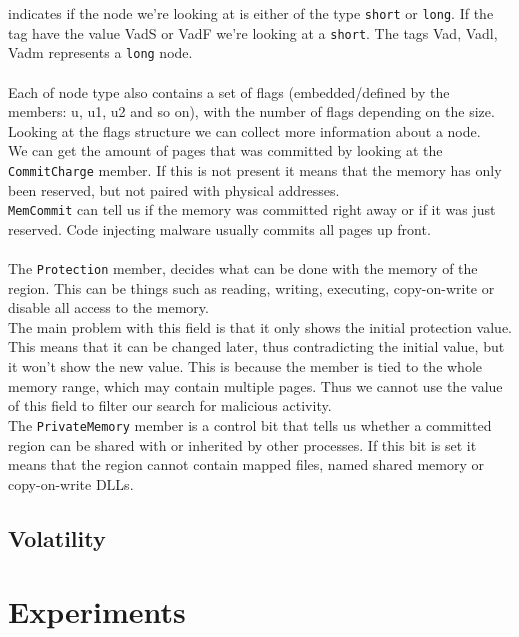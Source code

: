 \documentclass[a4paper]{article}
\begin{document}
indicates if the node we're looking at is either of the type \texttt{short} or \texttt{long}. If the tag have the
value VadS or VadF we're looking at a \texttt{short}. The tags Vad, Vadl, Vadm represents a \texttt{long} node. \\ \\
Each of node type also contains a set of flags (embedded/defined by the members: u, u1, u2
and so on), with the number of flags depending on the size. Looking at the flags structure we can
collect more information about a node. \\
We can get the amount of pages that was committed by looking at the \texttt{CommitCharge} member. If
this is not present it means that the memory has only been reserved, but not paired with physical
addresses. \\
\texttt{MemCommit} can tell us if the memory was committed right away or if it was just reserved. Code
injecting malware usually commits all pages up front. \\\\
%
The \texttt{Protection} member, decides what can be done with the memory of the region. This can
be things such as reading, writing, executing, copy-on-write or disable all access to the memory. \\
The main problem with this field is that it only shows the initial protection value. This means
that it can be changed later, thus contradicting the initial value, but it won't show the new value.
This is because the member is tied to the whole memory range, which may contain multiple pages.
Thus we cannot use the value of this field to filter our search for malicious activity. \\
%
The \texttt{PrivateMemory} member is a control bit that tells us whether a committed region can be
shared with or inherited by other processes. If this bit is set it means that the region cannot
contain mapped files, named shared memory or copy-on-write DLLs. \\



\subsection{Volatility}





\newpage

\section{Experiments}
\end{document}
